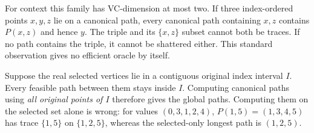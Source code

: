 \documentclass[acmsmall,11pt,nonacm,natbib=false]{acmart}
\begin{document}
For context this family has VC-dimension at most two. If three index-ordered
points $x,y,z$ lie on a canonical path, every canonical path containing
$x,z$ contains $P(x,z)$ and hence $y$. The triple and its $\{x,z\}$ subset
cannot both be traces. If no path contains the triple, it cannot be shattered
either. This standard observation gives no efficient oracle by itself.

Suppose the real selected vertices lie in a contiguous original index
interval $I$. Every feasible path between them stays inside $I$. Computing
canonical paths using \emph{all original points of $I$} therefore gives the
global paths. Computing them on the selected set alone is wrong: for values
$(0,3,1,2,4)$, $P(1,5)=(1,3,4,5)$ has trace $\{1,5\}$ on
$\{1,2,5\}$, whereas the selected-only longest path is $(1,2,5)$.
\end{document}
